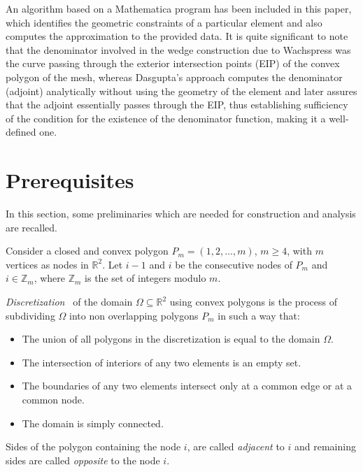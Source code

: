 \documentclass[automatic-bibliography, defaultmaths=false]{univsci}
\begin{document}
An algorithm based on a Mathematica program has been included in this paper,
which identifies the geometric constraints of a particular element and also
computes the approximation to the provided data. It is quite significant to note
that the denominator involved in the wedge construction due to Wachspress was
the curve passing through the exterior intersection points (EIP) of the convex
polygon of the mesh, whereas Dasgupta's approach computes the denominator
(adjoint) analytically without using the geometry of the element and later
assures that the adjoint essentially passes through the EIP, thus establishing
sufficiency of the condition for the existence of the denominator function,
making it a well-defined one.

\section{Prerequisites}\label{sec2}
In this section, some preliminaries which are needed for construction and
analysis are recalled.

Consider a closed and convex polygon $P_m = (1,2,\ldots,m)$, $m \geq 4$, with
$m$ vertices as nodes in $\mathbb{R}^2$. Let $i-1$ and $i$ be the consecutive
nodes of $P_m$ and $i \in \mathbb{Z}_m$, where $\mathbb{Z}_m$ is the set of
integers modulo $m$.

\begin{definition}
  \emph{Discretization}~\cite{phi} of the domain
  $\Omega \subseteq \mathbb{R}^2$ using convex polygons is the process of
  subdividing $\Omega$ into non overlapping polygons $P_m$ in such a way that:
        \begin{itemize}
          \item The union of all polygons in the discretization is equal
                to the domain $\Omega$.
          \item The intersection of interiors of any two elements is an empty
                set.
          \item The boundaries of any two elements intersect only at a
                common edge or at a common node.
          \item The domain is simply connected.
        \end{itemize}
\end{definition}

\begin{definition}
  Sides of the polygon containing the node $i$, are called \emph{adjacent}
  to $i$ and remaining sides are called \emph{opposite} to the node $i$.
\end{definition}
\end{document}
